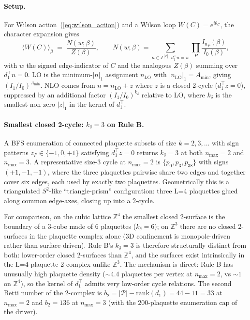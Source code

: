 \documentclass[11pt]{article}
\begin{document}
\paragraph{Setup.} For Wilson action~(\ref{eq:wilson_action}) and a Wilson
loop $W(C)=e^{i\theta_C}$, the character expansion gives
\begin{equation}
\langle W(C)\rangle_\beta\;=\;\frac{N(w;\beta)}{Z(\beta)},
\qquad
N(w;\beta)=\!\!\sum_{n\in\mathbb{Z}^{|\mathcal{P}|}:\,d_1^\top n=w}\!\prod_P\frac{I_{n_P}(\beta)}{I_0(\beta)},
\end{equation}
with $w$ the signed edge-indicator of $C$ and the analogous $Z(\beta)$ summing
over $d_1^\top n=0$. LO is the minimum-$|n|_1$ assignment $n_\text{LO}$ with
$|n_\text{LO}|_1=A_\text{min}$, giving $(I_1/I_0)^{A_\text{min}}$. NLO comes
from $n=n_\text{LO}+z$ where $z$ is a closed 2-cycle ($d_1^\top z=0$),
suppressed by an additional factor $(I_1/I_0)^{k_\delta}$ relative to LO,
where $k_\delta$ is the smallest non-zero $|z|_1$ in the kernel of $d_1^\top$.

\paragraph{Smallest closed 2-cycle: $k_\delta=3$ on Rule B.} A BFS enumeration
of connected plaquette subsets of size $k=2,3,\ldots$ with sign patterns
$z_P\in\{-1,0,+1\}$ satisfying $d_1^\top z=0$ returns $k_\delta=3$ at both
$n_\text{max}=2$ and $n_\text{max}=3$. A representative size-3 cycle at
$n_\text{max}=2$ is $\{p_0,p_3,p_{38}\}$ with signs $(+1,-1,-1)$, where the
three plaquettes pairwise share two edges and together cover six edges, each
used by exactly two plaquettes. Geometrically this is a triangulated $S^2$-like
``triangle-prism'' configuration: three L=4 plaquettes glued along common
edge-axes, closing up into a 2-cycle.

For comparison, on the cubic lattice $\mathbb{Z}^4$ the smallest closed
2-surface is the boundary of a 3-cube made of 6 plaquettes ($k_\delta=6$);
on $\mathbb{Z}^3$ there are no closed 2-surfaces in the plaquette complex
alone (3D confinement is monopole-driven rather than surface-driven). Rule B's
$k_\delta=3$ is therefore structurally distinct from both: lower-order
closed 2-surfaces than $\mathbb{Z}^4$, and the surfaces exist intrinsically
in the L=4-plaquette 2-complex unlike $\mathbb{Z}^3$. The mechanism is direct:
Rule B has unusually high plaquette density ($\sim 4.4$ plaquettes per vertex
at $n_\text{max}=2$, vs $\sim 1$ on $\mathbb{Z}^4$), so the kernel of
$d_1^\top$ admits very low-order cycle relations. The second Betti number of
the 2-complex is $b_2=|\mathcal{P}|-\mathrm{rank}(d_1)=44-11=33$ at
$n_\text{max}=2$ and $b_2=136$ at $n_\text{max}=3$ (with the 200-plaquette
enumeration cap of the driver).
\end{document}
